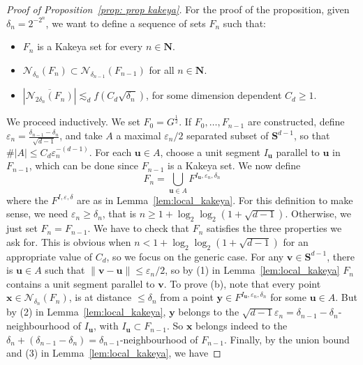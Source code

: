 \documentclass[10pt]{amsart}
\newcommand{\N}{\mathbf{N}}
\begin{document}
\begin{proof}[Proof of Proposition~\ref{prop: prop kakeya}] For the proof of the proposition, given $\delta_n=2^{-2^n}$, we want to define a sequence of sets $F_n$ such that:
\begin{itemize}
    \item[(a)] $F_n$ is a Kakeya set for every $n\in \N$.
    \item[(b)] $\mathcal{N}_{\delta_n}(F_n)\subset \mathcal{N}_{\delta_{n-1}}(F_{n-1})$ for all $n\in\N$.
    \item[(c)] $|\overline{\mathcal{N}_{2\delta_n}(F_n)}|\lesssim_d f(C_d\sqrt{\delta_n})$, for some dimension dependent $C_d\geq1$.
\end{itemize}
We proceed inductively. We set $F_0=G^{\frac 1 2}$. If $F_0,\dots, F_{n-1}$ are constructed, define $\varepsilon_n = \frac{\delta_{n-1} - \delta_n}{\sqrt{d-1}}$, and take $A$ a maximal $\varepsilon_n/2$ separated subset of $\mathbf{S}^{d-1}$, so that $\#|A|\leq C_d \varepsilon_n^{-(d-1)}$. For each $\mathbf{u}\in A$, choose a unit segment $I_\mathbf{u}$ parallel to $\mathbf{u}$ in $F_{n-1}$, which can be done since $F_{n-1}$ is a Kakeya set. We now define
\begin{equation*}
    F_n=\bigcup_{\mathbf{u}\in A}F^{I_\mathbf{u},\varepsilon_{n},\delta_n}
\end{equation*}
where the $F^{I,\varepsilon,\delta}$ are as in Lemma~\ref{lem:local_kakeya}. For this definition to make sense, we need $\varepsilon_n \geq\delta_n$, that is $n \geq 1+ \log_2 \log_2(1+\sqrt{d-1})$. Otherwise, we just set $F_n=F_{n-1}$. We have to check that $F_n$ satisfies the three properties we ask for. This is obvious when  $n < 1+ \log_2 \log_2(1+\sqrt{d-1})$ for an appropriate value of $C_d$, so we focus on the generic case. For any $\mathbf{v}\in \mathbf{S}^{d-1}$, there is $\mathbf{u}\in A$ such that $\|\mathbf{v}-\mathbf{u}\|\leq \varepsilon_{n}/2$, so by (1) in Lemma~\ref{lem:local_kakeya} $F_n$ contains a unit segment parallel to $\mathbf{v}$. To prove (b), note that every point $\mathbf{x}\in \mathcal{N}_{\delta_n}(F_n)$, is at distance $\leq \delta_n$ from a point $\mathbf{y}\in F^{I_\mathbf{u},\varepsilon_n,\delta_n}$ for some $\mathbf{u}\in A$. But by (2) in Lemma~\ref{lem:local_kakeya}, $\mathbf{y}$ belongs to the $\sqrt{d-1} \varepsilon_n = \delta_{n-1} - \delta_n$-neighbourhood of $I_{\mathbf{u}}$, with $I_{\mathbf{u}} \subset F_{n-1}$. So $\mathbf{x}$ belongs indeed to the $\delta_n+(\delta_{n-1}-\delta_n)=\delta_{n-1}$-neighbourhood of $F_{n-1}$. Finally, by the union bound and (3) in Lemma~\ref{lem:local_kakeya}, we have 

\end{proof}
\end{document}
